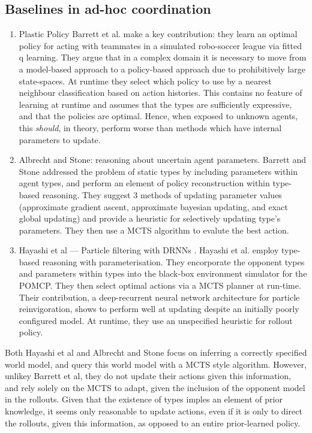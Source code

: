\subsection{Baselines in ad-hoc coordination}
\begin{enumerate}
    \item Plastic Policy \cite{Barrett2015} \newline \newline
Barrett et al. make a key contribution: they learn an optimal policy for acting with teammates in a simulated robo-soccer league via fitted q learning. They argue that in a complex domain it is necessary to move from a model-based approach to a policy-based approach due to prohibitively large state-spaces. At runtime they select which policy to use by a nearest neighbour classification based on action histories. This contains no feature of learning at runtime and assumes that the types are sufficiently expressive, and that the policies are optimal. Hence, when exposed to unknown agents, this \textit{should}, in theory, perform worse than methods which have internal parameters to update. 
    \item Albrecht and Stone: reasoning about uncertain agent parameters\cite{Albrecht_stone_2019}.  \newline \newline
Barrett and Stone addressed the problem of static types by including parameters within agent types, and perform an element of policy reconstruction within type-based reasoning. They suggest 3 methods of updating parameter values (approximate gradient ascent, approximate bayesian updating, and exact global updating) and provide a heuristic for selectively updating type's parameters. They then use a MCTS algorithm to evalute the best action. 
\item Hayashi et al --- Particle filtering with DRNNs \cite{Hayashi_et_al2020}. \newline \newline
Hayashi et al. employ type-based reasoning with parameterisation. They encorporate the opponent types and parameters within types into the black-box environment simulator for the POMCP. They then select optimal actions via a MCTS planner at run-time. Their contribution, a deep-recurrent neural network architecture for particle reinvigoration, shows to perform well at updating despite an initially poorly configured model. At runtime, they use an unspecified heuristic for rollout policy. 
\end{enumerate}
Both Hayashi et al and Albrecht and Stone focus on inferring a correctly specified world model, and query this world model with a MCTS style algorithm. However, unlikey Barrett et al, they do not update their actions given this information, and rely solely on the MCTS to adapt, given the inclusion of the opponent model in the rollouts. Given that the existence of types imples an element of prior knowledge, it seems only reasonable to update actions, even if it is only to direct the rollouts, given this information, as opposed to an entire prior-learned policy.  